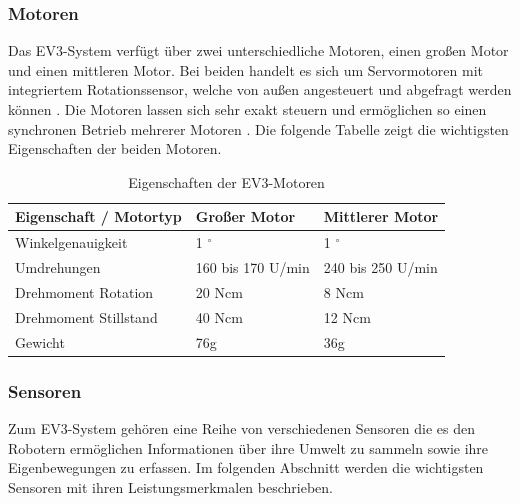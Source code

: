 \subsubsection{Motoren}
\color{finishing}
Das EV3-System verfügt über zwei unterschiedliche Motoren, einen großen Motor und einen mittleren Motor. 
Bei beiden handelt es sich um Servormotoren mit integriertem Rotationssensor, welche von außen angesteuert und abgefragt werden können \cite[vgl.][92]{Schobel.RobertaEV3Programmieren}. Die Motoren lassen sich sehr exakt steuern und ermöglichen so einen synchronen Betrieb mehrerer Motoren \cite[vgl.][Seite 29 f.]{Scholz.DasEV3}.
\smallskip
\newline
Die folgende Tabelle zeigt die wichtigsten Eigenschaften der beiden Motoren.
\begin{table}[ht]
	\begin{tabular}{|p{}|p{}|p{}|} \hline
		Eigenschaft / Motortyp		                & Großer Motor         & Mittlerer Motor    \\ \hline
		Winkelgenauigkeit       & 1 $^\circ$           & 1 $^\circ$         \\ \hline
		Umdrehungen    			& 160 bis 170 U/min    & 240 bis 250 U/min  \\ \hline 
		Drehmoment Rotation		& 20 Ncm               & 8 Ncm    			\\ \hline  
		Drehmoment Stillstand 	& 40 Ncm               & 12 Ncm    			\\ \hline  
		Gewicht    				& 76g                  & 36g   		 		\\ \hline
	\end{tabular}
	\centering
	\caption[Eigenschaften der EV3-Motortypen]{Eigenschaften der EV3-Motoren}
\end{table}
\subsubsection{Sensoren}
\color{finishing}
Zum EV3-System gehören eine Reihe von verschiedenen Sensoren die es den Robotern ermöglichen Informationen über ihre Umwelt zu sammeln sowie ihre Eigenbewegungen zu erfassen. Im folgenden Abschnitt werden die wichtigsten Sensoren mit ihren Leistungsmerkmalen beschrieben.
